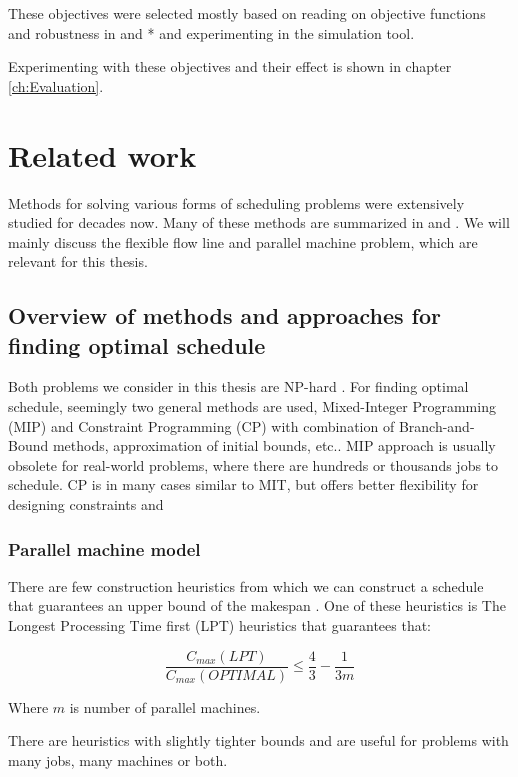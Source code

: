 \documentclass{ctuthesis}
\begin{document}
 These objectives were selected mostly based on reading on objective functions and robustness in \cite{pinedo} and \cite{tkindt}* and experimenting in the simulation tool. 
 
 Experimenting with these objectives and their effect is shown in chapter \ref{ch:Evaluation}.

\chapter{Related work}

Methods for solving various forms of scheduling problems were extensively studied for decades now. Many of these methods are summarized in \cite{pinedo} and \cite{bucker}. We will mainly discuss the flexible flow line and parallel machine problem, which are relevant for this thesis. 

\section{Overview of methods and approaches for finding optimal schedule}

Both problems we consider in this thesis are NP-hard \cite{complexity}. For finding optimal schedule, seemingly two general methods are used, Mixed-Integer Programming (MIP) and Constraint Programming (CP) with combination of Branch-and-Bound methods, approximation of initial bounds, etc.. MIP approach is usually obsolete for real-world problems, where there are hundreds or thousands jobs to schedule. CP is in many cases similar to MIT, but offers better flexibility for designing constraints and 

\subsection{Parallel machine model}

There are few construction heuristics from which we can construct a schedule that guarantees an upper bound of the makespan \cite{gram}. One of these heuristics is The Longest Processing Time first (LPT) heuristics \cite{pinedo} that guarantees that:

\begin{equation}
\dfrac{C_{max}(LPT)}{C_{max}(OPTIMAL)} \leq \dfrac{4}{3} - \dfrac{1}{3m}
\end{equation}

Where $m$ is number of parallel machines.

There are heuristics with slightly tighter bounds and are useful for problems with many jobs, many machines or both. 
\end{document}
